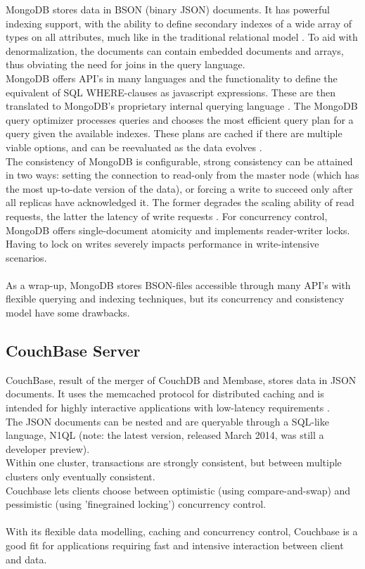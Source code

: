 \documentclass{article}
\begin{document}
MongoDB stores data in BSON (binary JSON) documents. It has powerful indexing support, with the ability to define secondary indexes of a wide array of types on all attributes, much like in the traditional relational model \cite{mongodb_indexes}. To aid with denormalization, the documents can contain embedded documents and arrays, thus obviating the need for joins in the query language.
\\MongoDB offers API's in many languages and the functionality to define the equivalent of SQL WHERE-clauses as javascript expressions. These are then translated to MongoDB's proprietary internal querying language \cite{grolinger2013data}. The MongoDB query optimizer processes queries and chooses the most efficient query plan for a query given the available indexes. These plans are cached if there are multiple viable options, and can be reevaluated as the data evolves \cite{mongodb_query_plans}.
\\The consistency of MongoDB is configurable, strong consistency can be attained in two ways: setting the connection to read-only from the master node (which has the most up-to-date version of the data), or forcing a write to succeed only after all replicas have acknowledged it. The former degrades the scaling ability of read requests, the latter the latency of write requests \cite{grolinger2013data}.
For concurrency control, MongoDB offers single-document atomicity and implements reader-writer locks. Having to lock on writes severely impacts performance in write-intensive scenarios.
\\\\As a wrap-up, MongoDB stores BSON-files accessible through many API's with flexible querying and indexing techniques, but its concurrency and consistency model have some drawbacks.

\subsection{CouchBase Server}

CouchBase, result of the merger of CouchDB and Membase, stores data in JSON documents. It uses the memcached protocol for distributed caching and is intended for highly interactive applications with low-latency requirements \cite{grolinger2013data}\cite{couchbase_about}.
\\The JSON documents can be nested and are queryable through a SQL-like language, N1QL (note: the latest version, released March 2014, was still a developer preview)\cite{couchbase_n1ql}.
\\Within one cluster, transactions are strongly consistent, but between multiple clusters only eventually consistent.
\\Couchbase lets clients choose between optimistic (using compare-and-swap) and pessimistic (using 'finegrained locking') concurrency control.
\\\\With its flexible data modelling, caching and concurrency control, Couchbase is a good fit for applications requiring fast and intensive interaction between client and data.
\end{document}
